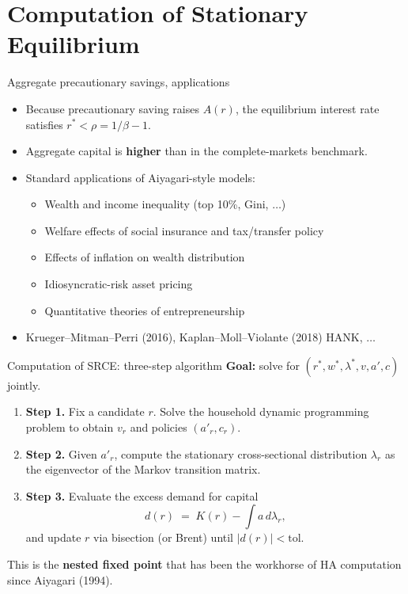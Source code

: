 \documentclass[10pt,english,aspectratio=169]{beamer}
\begin{document}
\section{Computation of Stationary Equilibrium}

\begin{frame}{Aggregate precautionary savings, applications}
\begin{itemize}
\item Because precautionary saving raises $A(r)$, the equilibrium interest rate satisfies $r^* < \rho = 1/\beta-1$.
\medskip
\item Aggregate capital is \textbf{higher} than in the complete-markets benchmark.
\medskip
\item Standard applications of Aiyagari-style models:
  \begin{itemize}
  \item Wealth and income inequality (top 10\%, Gini, $\ldots$)
  \item Welfare effects of social insurance and tax/transfer policy
  \item Effects of inflation on wealth distribution
  \item Idiosyncratic-risk asset pricing
  \item Quantitative theories of entrepreneurship
  \end{itemize}
\medskip
\item Krueger--Mitman--Perri (2016), Kaplan--Moll--Violante (2018) HANK, $\ldots$
\end{itemize}
\end{frame}

\begin{frame}{Computation of SRCE: three-step algorithm}
\textbf{Goal:} solve for $(r^*, w^*, \lambda^*, v, a', c)$ jointly.
\medskip

\begin{enumerate}
\item \textbf{Step 1.} Fix a candidate $r$. Solve the household dynamic programming problem to obtain $v_r$ and policies $(a'_r, c_r)$.
\medskip
\item \textbf{Step 2.} Given $a'_r$, compute the stationary cross-sectional distribution $\lambda_r$ as the eigenvector of the Markov transition matrix.
\medskip
\item \textbf{Step 3.} Evaluate the excess demand for capital
\[
d(r) \;=\; K(r) - \int a\,d\lambda_r,
\]
and update $r$ via bisection (or Brent) until $|d(r)|<\text{tol}$.
\end{enumerate}
\medskip
This is the \textbf{nested fixed point} that has been the workhorse of HA computation since Aiyagari (1994).
\end{frame}
\end{document}
